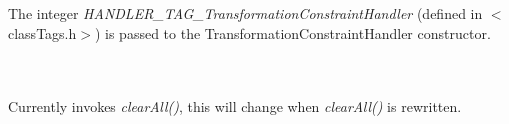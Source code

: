  \\
\\ 
The integer {\em HANDLER\_TAG\_TransformationConstraintHandler} (defined in
$<$classTags.h$>$) is passed to the TransformationConstraintHandler
constructor. 

 \\
\\ 
Currently invokes {\em clearAll()}, this will change when {\em
clearAll()} is rewritten. \\

\\
 \\
